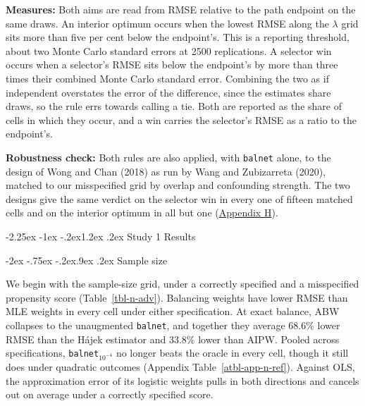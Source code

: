 \documentclass[
  12pt,
  a4paper,
]{article}
\makeatletter
\renewcommand\section{\@startsection{section}{1}{\z@}%
  {-2.25ex \@plus -1ex \@minus -.2ex}{1.2ex \@plus .2ex}%
  {\normalfont\Large\bfseries}}
\renewcommand\subsection{\@startsection{subsection}{2}{\z@}%
  {-2ex \@plus -.75ex \@minus -.2ex}{.9ex \@plus .2ex}%
  {\normalfont\large\bfseries}}
\makeatother
\begin{document}
\textbf{Measures:} Both aims are read from RMSE relative to the path
endpoint on the same draws. An interior optimum occurs when the lowest
RMSE along the \(\lambda\) grid sits more than five per cent below the
endpoint's. This is a reporting threshold, about two Monte Carlo
standard errors at 2500 replications. A selector win occurs when a
selector's RMSE sits below the endpoint's by more than three times their
combined Monte Carlo standard error. Combining the two as if independent
overstates the error of the difference, since the estimates share draws,
so the rule errs towards calling a tie. Both are reported as the share
of cells in which they occur, and a win carries the selector's RMSE as a
ratio to the endpoint's.

\textbf{Robustness check:} Both rules are also applied, with
\texttt{balnet} alone, to the design of Wong and Chan (2018) as run by
Wang and Zubizarreta (2020), matched to our misspecified grid by overlap
and confounding strength. The two designs give the same verdict on the
selector win in every one of fifteen matched cells and on the interior
optimum in all but one (\hyperref[sec-app-wc]{Appendix H}).

\section{Study 1 Results}\label{study-1-results}

\subsection{Sample size}\label{sec-s1-n}

We begin with the sample-size grid, under a correctly specified and a
misspecified propensity score (Table~\ref{tbl-n-adv}). Balancing weights
have lower RMSE than MLE weights in every cell under either
specification. At exact balance, ABW collapses to the unaugmented
\texttt{balnet}, and together they average \(68.6\%\) lower RMSE than
the Hájek estimator and \(33.8\%\) lower than AIPW. Pooled across
specifications, \texttt{balnet}\(_{10^{-4}}\) no longer beats the oracle
in every cell, though it still does under quadratic outcomes
(Appendix Table~\ref{atbl-app-n-ref}). Against OLS, the approximation
error of its logistic weights pulls in both directions and cancels out
on average under a correctly specified score.
\end{document}
